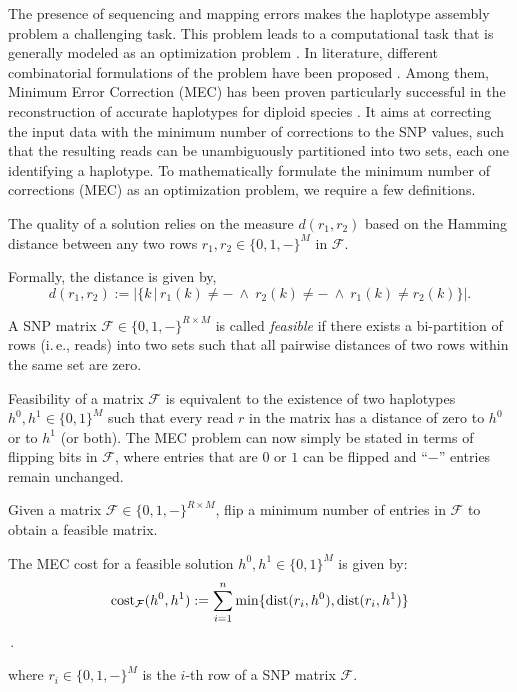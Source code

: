 The presence of sequencing and mapping errors makes the haplotype assembly problem a challenging task. 
This problem leads to
a computational task that is generally modeled as an optimization problem .
In literature, different combinatorial formulations of the problem have been
proposed \citep{lippert2002algorithmic}. Among them, Minimum Error Correction (MEC) \citep{lippert2002algorithmic} has
been proven particularly successful in the reconstruction of accurate haplotypes for
diploid species \citep{martin2016whatshap, he2010optimal, CDW13_exact, Glusman2014}. It aims at correcting the input data with the minimum
number of corrections to the SNP values, such that the resulting reads can be unambiguously partitioned into two sets, each one identifying a haplotype. 
To mathematically formulate the minimum number of corrections (MEC) as an optimization problem, we require a few definitions.

The quality of a solution relies on the measure $d(r_1,r_2)$ based on the Hamming distance between any two rows $r_1,r_2\in\{0,1, -\}^M$ in $\mathcal{F}$.
\begin{definition}[Distance] 
 Formally, the distance is given by,
\[d(r_1,r_2):= \big|\big\{k\,\big|\,r_1(k)\neq -\ \wedge\ r_2(k)\neq -\ \wedge\ r_1(k)\neq r_2(k)\big\}\big|.\]
\label{eq:distance}
\end{definition}

\begin{definition}[Feasibility]
A SNP matrix $\mathcal{F}\in\{0,1,-\}^{R\times M}$ is called \emph{feasible} if there exists a bi-partition of rows (i.\,e., reads) into two sets such that all pairwise distances of two rows within the same set are zero.
\label{def:feasible-mec}
\end{definition}
Feasibility of a matrix $\mathcal{F}$ is equivalent to the existence of two haplotypes $h^0,h^1\in\{0,1\}^M$ such that every read $r$ in the matrix has a distance of zero to $h^0$ or to $h^1$ (or both).
The MEC problem can now simply be stated in terms of flipping bits in $\mathcal{F}$, where entries that are $0$ or $1$ can be flipped and ``$-$'' entries remain unchanged.

\begin{problem}[MEC]
Given a matrix $\mathcal{F}\in\{0,1,-\}^{R\times M}$, flip a minimum number of entries in $\mathcal{F}$ to obtain a feasible matrix.
\label{prob:mec}
\end{problem}


\begin{definition}
The MEC cost for a feasible solution $h^0,h^1\in\{0,1\}^M$ is given by: \\
    \[\mathrm{cost}_{\mathcal{F}}(h^0,h^1) := \sum_{i=1}^{n} \min\{\mathrm{dist}(r_i,h^0), \mathrm{dist}(r_i,h^1)\}\]\,.

where $r_i \in \{0,1, -\}^M$ is the $i$-th row of a SNP matrix $\mathcal{F}$.
\label{eq:cost}
\end{definition}


